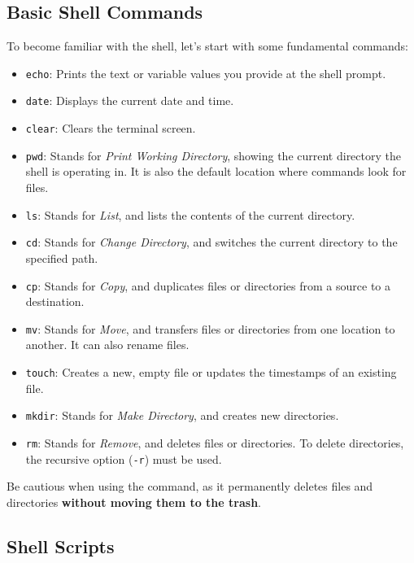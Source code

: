 \subsection{Basic Shell Commands}

To become familiar with the shell, let’s start with some fundamental commands:

\begin{itemize}
    \item \texttt{echo}: Prints the text or variable values you provide at the shell prompt.
    \item \texttt{date}: Displays the current date and time.
    \item \texttt{clear}: Clears the terminal screen.
    \item \texttt{pwd}: Stands for \textit{Print Working Directory}, showing the current directory the shell is operating in. It is also the default location where commands look for files.
    \item \texttt{ls}: Stands for \textit{List}, and lists the contents of the current directory.
    \item \texttt{cd}: Stands for \textit{Change Directory}, and switches the current directory to the specified path.
    \item \texttt{cp}: Stands for \textit{Copy}, and duplicates files or directories from a source to a destination.
    \item \texttt{mv}: Stands for \textit{Move}, and transfers files or directories from one location to another. It can also rename files.
    \item \texttt{touch}: Creates a new, empty file or updates the timestamps of an existing file.
    \item \texttt{mkdir}: Stands for \textit{Make Directory}, and creates new directories.
    \item \texttt{rm}: Stands for \textit{Remove}, and deletes files or directories. To delete directories, the recursive option (\texttt{-r}) must be used.
\end{itemize}

\begin{warningblock}
    Be cautious when using the  command, as it permanently deletes files and directories \textbf{without moving them to the trash}.
\end{warningblock}

\subsection{Shell Scripts}

